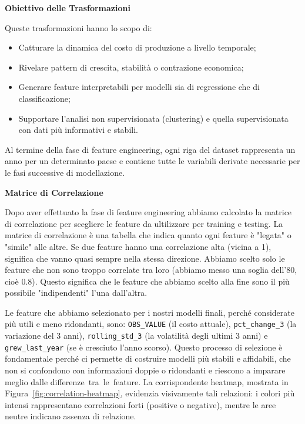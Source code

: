 \documentclass[conference]{IEEEtran}
\begin{document}
\vspace{1em}\noindent\textbf{Obiettivo delle Trasformazioni}

Queste trasformazioni hanno lo scopo di:

\begin{itemize}
    \item Catturare la dinamica del costo di produzione a livello temporale;
    \item Rivelare pattern di crescita, stabilità o contrazione economica;
    \item Generare feature interpretabili per modelli sia di regressione che di classificazione;
    \item Supportare l’analisi non supervisionata (clustering) e quella supervisionata con dati più informativi e stabili.
\end{itemize}

Al termine della fase di feature engineering, ogni riga del dataset rappresenta un anno per un determinato paese e contiene tutte le variabili derivate necessarie per le fasi successive di modellazione.

\vspace{1em} \noindent\textbf{Matrice di Correlazione}

Dopo aver effettuato la fase di feature engineering abbiamo calcolato la matrice di correlazione per scegliere le feature da ultilizzare per training e testing. La matrice di correlazione è una tabella che indica quanto ogni feature è "legata" o "simile" alle altre. Se due feature hanno una correlazione alta (vicina a 1), significa che vanno quasi sempre nella stessa direzione.
Abbiamo scelto solo le feature che non sono troppo correlate tra loro (abbiamo messo una soglia dell'80, cioè 0.8). Questo significa che le feature che abbiamo scelto alla fine sono il più possibile "indipendenti" l'una dall'altra.

Le feature che abbiamo selezionato per i nostri modelli finali, perché considerate più utili e meno ridondanti, sono: \texttt{OBS\_VALUE} (il costo attuale), \texttt{pct\_change\_3} (la variazione del 3 anni), \texttt{rolling\_std\_3} (la volatilità degli ultimi 3 anni) e \texttt{grew\_last\_year} (se è cresciuto l'anno scorso).
Questo processo di selezione è fondamentale perché ci permette di costruire modelli più stabili e affidabili, che non si confondono con informazioni doppie o ridondanti e riescono a imparare meglio dalle differenze tra le feature.
La corrispondente heatmap, mostrata in Figura~\ref{fig:correlation-heatmap}, evidenzia visivamente tali relazioni: i colori più intensi rappresentano correlazioni forti (positive o negative), mentre le aree neutre indicano assenza di relazione.
\end{document}
